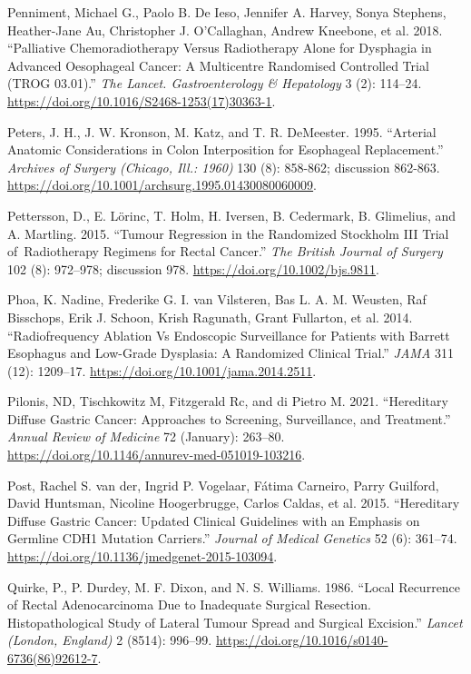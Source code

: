 \documentclass[
  letterpaper,
]{scrbook}
\newlength{\cslhangindent}
\newenvironment{CSLReferences}[2] %
 {\begin{list}{}{%
  \setlength{\itemindent}{0pt}
  \setlength{\leftmargin}{0pt}
  \setlength{\parsep}{0pt}
  \ifodd #1
   \setlength{\leftmargin}{\cslhangindent}
   \setlength{\itemindent}{-1\cslhangindent}
  \fi
  \setlength{\itemsep}{#2\baselineskip}}}
 {\end{list}}
\begin{document}
\begin{CSLReferences}{1}{0}
Penniment, Michael G., Paolo B. De Ieso, Jennifer A. Harvey, Sonya
Stephens, Heather-Jane Au, Christopher J. O'Callaghan, Andrew Kneebone,
et al. 2018. {``Palliative Chemoradiotherapy Versus Radiotherapy Alone
for Dysphagia in Advanced Oesophageal Cancer: A Multicentre Randomised
Controlled Trial ({TROG} 03.01).''} \emph{The Lancet. Gastroenterology
\& Hepatology} 3 (2): 114--24.
\url{https://doi.org/10.1016/S2468-1253(17)30363-1}.

Peters, J. H., J. W. Kronson, M. Katz, and T. R. DeMeester. 1995.
{``Arterial Anatomic Considerations in Colon Interposition for
Esophageal Replacement.''} \emph{Archives of Surgery (Chicago, Ill.:
1960)} 130 (8): 858-862; discussion 862-863.
\url{https://doi.org/10.1001/archsurg.1995.01430080060009}.

Pettersson, D., E. Lörinc, T. Holm, H. Iversen, B. Cedermark, B.
Glimelius, and A. Martling. 2015. {``Tumour Regression in the Randomized
{Stockholm} {III} {Trial} of~Radiotherapy Regimens for Rectal Cancer.''}
\emph{The British Journal of Surgery} 102 (8): 972--978; discussion 978.
\url{https://doi.org/10.1002/bjs.9811}.

Phoa, K. Nadine, Frederike G. I. van Vilsteren, Bas L. A. M. Weusten,
Raf Bisschops, Erik J. Schoon, Krish Ragunath, Grant Fullarton, et al.
2014. {``Radiofrequency Ablation Vs Endoscopic Surveillance for Patients
with {Barrett} Esophagus and Low-Grade Dysplasia: A Randomized Clinical
Trial.''} \emph{JAMA} 311 (12): 1209--17.
\url{https://doi.org/10.1001/jama.2014.2511}.

Pilonis, ND, Tischkowitz M, Fitzgerald Rc, and di Pietro M. 2021.
{``Hereditary {Diffuse} {Gastric} {Cancer}: {Approaches} to {Screening},
{Surveillance}, and {Treatment}.''} \emph{Annual Review of Medicine} 72
(January): 263--80.
\url{https://doi.org/10.1146/annurev-med-051019-103216}.

Post, Rachel S. van der, Ingrid P. Vogelaar, Fátima Carneiro, Parry
Guilford, David Huntsman, Nicoline Hoogerbrugge, Carlos Caldas, et al.
2015. {``Hereditary Diffuse Gastric Cancer: Updated Clinical Guidelines
with an Emphasis on Germline {CDH1} Mutation Carriers.''} \emph{Journal
of Medical Genetics} 52 (6): 361--74.
\url{https://doi.org/10.1136/jmedgenet-2015-103094}.

Quirke, P., P. Durdey, M. F. Dixon, and N. S. Williams. 1986. {``Local
Recurrence of Rectal Adenocarcinoma Due to Inadequate Surgical
Resection. {Histopathological} Study of Lateral Tumour Spread and
Surgical Excision.''} \emph{Lancet (London, England)} 2 (8514): 996--99.
\url{https://doi.org/10.1016/s0140-6736(86)92612-7}.


\end{CSLReferences}
\end{document}
